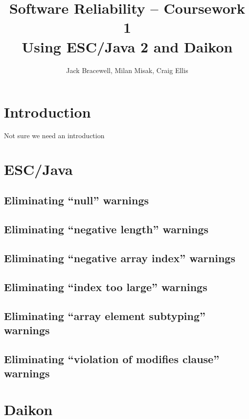 \documentclass{article}
\title{Software Reliability -- Coursework 1 \\ Using ESC/Java 2 and Daikon}
\author{Jack Bracewell, Milan Misak, Craig Ellis}
\date{}
\begin{document}
\maketitle

\section{Introduction}

Not sure we need an introduction

\section{ESC/Java}

\subsection{Eliminating ``null'' warnings}

\subsection{Eliminating ``negative length'' warnings}

\subsection{Eliminating ``negative array index'' warnings}

\subsection{Eliminating ``index too large'' warnings}

\subsection{Eliminating ``array element subtyping'' warnings}

\subsection{Eliminating ``violation of modifies clause'' warnings}

\section{Daikon}
\end{document}
